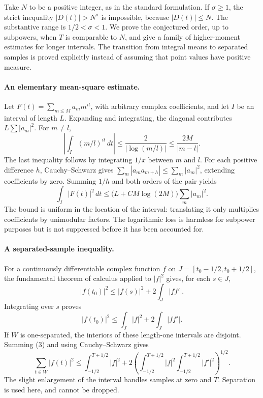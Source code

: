 \documentclass[11pt]{article}
\begin{document}
Take $N$ to be a positive integer, as in the standard formulation.
If $\sigma\ge1$, the strict inequality $|D(t)|>N^\sigma$ is impossible,
because $|D(t)|\le N$. The substantive range is $1/2<\sigma<1$.
We prove the conjectured order, up to subpowers, when $T$ is comparable
to $N$, and give a family of higher-moment estimates for longer intervals.
The transition from integral means to separated samples is proved
explicitly instead of assuming that point values have positive measure.

\paragraph{An elementary mean-square estimate.}
Let $F(t)=\sum_{m\le M}a_m m^{it}$, with arbitrary complex coefficients,
and let $I$ be an interval of length $L$. Expanding and integrating,
the diagonal contributes $L\sum|a_m|^2$. For $m\ne l$,
\[
 \left|\int_I(m/l)^{it}\,dt\right|
                  \le\frac2{|\log(m/l)|}
                  \le\frac{2M}{|m-l|}.                 \tag{1}
\]
The last inequality follows by integrating $1/x$ between $m$ and $l$.
For each positive difference $h$, Cauchy--Schwarz gives
$\sum_m|a_ma_{m+h}|\le\sum_m|a_m|^2$, extending coefficients by zero.
Summing $1/h$ and both orders of the pair yields
\[
           \int_I|F(t)|^2\,dt
                   \le\bigl(L+C M\log(2M)\bigr)\sum_m|a_m|^2.
                                                               \tag{2}
\]
The bound is uniform in the location of the interval: translating it
only multiplies coefficients by unimodular factors. The logarithmic
loss is harmless for subpower purposes but is not suppressed before
it has been accounted for.

\paragraph{A separated-sample inequality.}
For a continuously differentiable complex function $f$ on
$J=[t_0-1/2,t_0+1/2]$, the fundamental theorem of calculus applied
to $|f|^2$ gives, for each $s\in J$,
\[
            |f(t_0)|^2\le|f(s)|^2+2\int_J|f f'|.
\]
Integrating over $s$ proves
\[
               |f(t_0)|^2\le\int_J|f|^2+2\int_J|f f'|. \tag{3}
\]
If $W$ is one-separated, the interiors of these length-one intervals
are disjoint. Summing (3) and using Cauchy--Schwarz gives
\[
 \sum_{t\in W}|f(t)|^2
 \le\int_{-1/2}^{T+1/2}|f|^2
 +2\left(\int_{-1/2}^{T+1/2}|f|^2
                \int_{-1/2}^{T+1/2}|f'|^2\right)^{1/2}. \tag{4}
\]
The slight enlargement of the interval handles samples at zero and
$T$. Separation is used here, and cannot be dropped.
\end{document}

